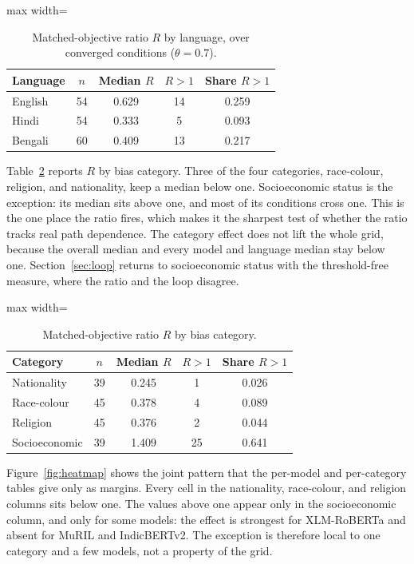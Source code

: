 \documentclass[Afour,sageh,times]{sagej}
\begin{document}
\begin{table}[htbp]
\small\sf\centering
\caption{Matched-objective ratio $R$ by language, over converged conditions ($\theta = 0.7$).}
\label{tab:perlang}
\begin{adjustbox}{max width=\linewidth}
\begin{tabular}{lcccc}
\toprule
\textbf{Language} & \textbf{$n$} & \textbf{Median $R$} & \textbf{$R>1$} & \textbf{Share $R>1$} \\
\midrule
English & 54 & 0.629 & 14 & 0.259 \\
Hindi & 54 & 0.333 & 5 & 0.093 \\
Bengali & 60 & 0.409 & 13 & 0.217 \\
\bottomrule
\end{tabular}
\end{adjustbox}
\end{table}

Table~\ref{tab:percat} reports $R$ by bias category. Three of the four categories, race-colour, religion, and nationality, keep a median below one. Socioeconomic status is the exception: its median sits above one, and most of its conditions cross one. This is the one place the ratio fires, which makes it the sharpest test of whether the ratio tracks real path dependence. The category effect does not lift the whole grid, because the overall median and every model and language median stay below one. Section~\ref{sec:loop} returns to socioeconomic status with the threshold-free measure, where the ratio and the loop disagree.

\begin{table}[htbp]
\small\sf\centering
\caption{Matched-objective ratio $R$ by bias category.}
\label{tab:percat}
\begin{adjustbox}{max width=\linewidth}
\begin{tabular}{lcccc}
\toprule
\textbf{Category} & \textbf{$n$} & \textbf{Median $R$} & \textbf{$R>1$} & \textbf{Share $R>1$} \\
\midrule
Nationality & 39 & 0.245 & 1 & 0.026 \\
Race-colour & 45 & 0.378 & 4 & 0.089 \\
Religion & 45 & 0.376 & 2 & 0.044 \\
Socioeconomic & 39 & 1.409 & 25 & 0.641 \\
\bottomrule
\end{tabular}
\end{adjustbox}
\end{table}

Figure~\ref{fig:heatmap} shows the joint pattern that the per-model and per-category tables give only as margins. Every cell in the nationality, race-colour, and religion columns sits below one. The values above one appear only in the socioeconomic column, and only for some models: the effect is strongest for XLM-RoBERTa and absent for MuRIL and IndicBERTv2. The exception is therefore local to one category and a few models, not a property of the grid.
\end{document}
